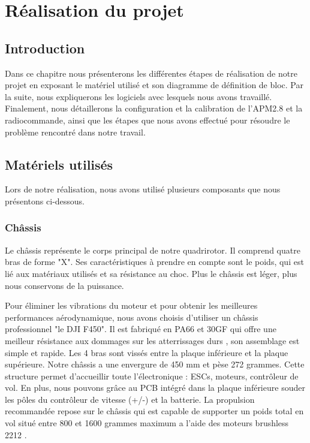 

\chapter{ Réalisation du projet }






\clearpage
\section*{Introduction}

Dans ce chapitre nous présenterons les différentes étapes de réalisation de notre projet en exposant le matériel utilisé et son diagramme de définition de bloc. Par la suite, nous expliquerons les logiciels avec lesquels nous avons travaillé. Finalement, nous détaillerons la configuration et la calibration de l'APM2.8 et la radiocommande, ainsi que les étapes que nous avons effectué pour résoudre le problème rencontré dans notre travail. 

\section{Matériels utilisés}
Lors de notre réalisation, nous avons utilisé plusieurs composants que nous présentons ci-dessous.
\subsection{Châssis}
Le châssis représente le corps principal de notre quadrirotor. Il comprend quatre bras de forme "X". Ses caractéristiques à prendre en compte sont le poids, qui est lié aux matériaux utilisés et sa résistance au choc. Plus le châssis est léger, plus nous conservons de la puissance.

Pour éliminer les vibrations du moteur et pour obtenir les meilleures performances aérodynamique, nous avons choisis d’utiliser un châssis professionnel "le DJI F450". Il est fabriqué en PA66 et 30GF qui offre une meilleur résistance aux dommages sur les atterrissages durs \cite{smartcube}, son assemblage est simple et rapide. Les 4 bras sont vissés entre la plaque inférieure et la plaque supérieure. Notre châssis a une envergure de 450 mm et pèse 272 grammes.
Cette structure permet d'accueillir toute l'électronique : ESCs, moteurs, contrôleur de vol. En plus, nous pouvons grâce au PCB intégré dans la plaque inférieure souder les pôles du contrôleur de vitesse (+/-) et la batterie. La propulsion recommandée repose sur le châssis qui est capable de supporter un poids total en vol situé entre 800 et 1600 grammes maximum a l'aide des moteurs brushless 2212 \cite{studiosport}.

